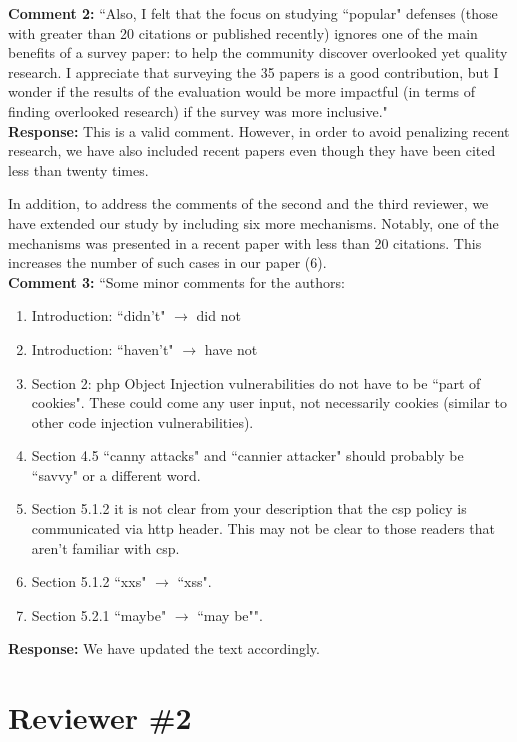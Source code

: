 \documentclass[10pt,journal,compsoc]{IEEEtran}
\begin{document}
\noindent
{\bf Comment 2:} ``Also, I felt that the focus on
studying ``popular" defenses (those with
greater than 20 citations or published recently) ignores one of the	
main benefits of a survey paper: to help the community discover
overlooked yet quality research. I appreciate that surveying the 35
papers is a good contribution, but I wonder if the results of the
evaluation would be more impactful (in terms of finding overlooked
research) if the survey was more inclusive."\\

\noindent
{\bf Response:}
This is a valid comment.
However,
in order to avoid penalizing recent research,
we have also included recent papers
even though they have been cited less than twenty times.

In addition,
to address the comments of the second
and the third reviewer,
we have extended our study by
including six more mechanisms.
Notably,
one of the mechanisms was presented in a recent
paper with less than 20 citations.
This increases the number of such cases
in our paper (6).\\

\noindent
{\bf Comment 3:} ``Some minor comments for the authors:
\begin{enumerate}
\item Introduction: ``didn't" $\rightarrow$ did not
\item Introduction: ``haven't" $\rightarrow$ have not
\item Section 2: {\sc php} Object Injection vulnerabilities do not have to be
 ``part of cookies". These could come any user input, not necessarily
 cookies (similar to other code injection vulnerabilities).
\item Section 4.5 ``canny attacks" and ``cannier attacker" should probably
 be ``savvy" or a different word.
\item Section 5.1.2 it is not clear from your description that the {\sc csp}
 policy is communicated via {\sc http} header. This may not be clear to
 those readers that aren't familiar with {\sc csp}.
\item Section 5.1.2 ``{\sc xxs}" $\rightarrow$ ``{\sc xss}".
\item Section 5.2.1 ``maybe" $\rightarrow$ ``may be"".
\end{enumerate}

\noindent
{\bf Response:}
We have updated the text accordingly.\\

\section{Reviewer \#2}
\label{sec:r2}
\end{document}
